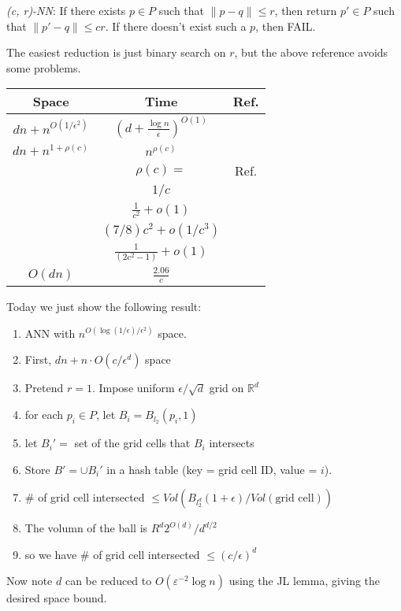 \documentclass[11pt]{article}
\newcommand{\eps}{\varepsilon}
\begin{document}
\emph{(c, r)-NN}: If there exists $p \in P$ such that $\|p - q\| \leq r$, then return $p' \in P$ such that $\|p' - q\| \leq cr$. If there doesn't exist such a $p$, then FAIL.

The easiest reduction is just binary search on $r$, but the above reference avoids some problems.

\begin{center}
 \begin{tabular}{||c c c||} 
 \hline
 Space & Time & Ref. \\
 \hline\hline
 $dn + n^{O(1/\epsilon^2)}$ & $(d + \frac{\log n}{\epsilon})^{O(1)}$ & \cite{KushilevitzOR98}\cite{indyk1998approximate} \\ 
 \hline
 $dn + n^{1 + \rho(c)}$ & $n^{\rho(c)}$ &  \\
 \hline\hline
 &$\rho(c)=$& Ref. \\
 \hline\hline
 &$1/c$ & \cite{gionis1999similarity} \\
 \hline
 &$\frac{1}{c^2} + o(1)$ & \cite{andoni2006near}\\
 \hline
 &$(7/8)c^2 + o(1/c^3)$ & \cite{andoni2014beyond} \\
 \hline
 &$\frac{1}{(2c^2 - 1)} + o(1)$ & \cite{AndoniR15} \\
 \hline
 $O(dn)$ & $\frac{2.06}{c}$ & \cite{motwani2007lower}\\
 \hline
\end{tabular}
\end{center}

Today we just show the following result:

\begin{enumerate}
\item ANN with $n^{O(\log(1/\epsilon)/\epsilon^2)}$ space.
\item First, $dn+n\cdot O(c/\epsilon^d)$ space
\item Pretend $r=1$. Impose uniform $\epsilon/\sqrt{d}$ grid on $\mathbb{R}^d$
\item for each $p_i\in P$, let $B_i=B_{l_2}(p_i,1)$
\item let $B_i'=$ set of the grid cells that $B_i$ intersects
\item Store $B'=\cup B_i'$ in a hash table (key = grid cell ID, value = $i$). 
\item $\#$ of grid cell intersected $\leq Vol(B_{l_2^d}(1+\epsilon)/Vol(\text{grid cell}))$
\item The volumn of the ball is $R^d2^{O(d)}/d^{d/2}$ 
\item so we have $\#$ of grid cell intersected $\leq(c/\epsilon)^d$
\end{enumerate}

Now note $d$ can be reduced to $O(\eps^{-2}\log n)$ using the JL lemma, giving the desired space bound.



\end{document}
